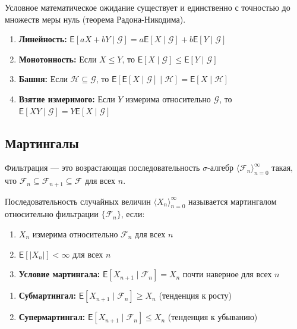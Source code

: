 \documentclass[11pt, a4paper]{extarticle}
\newcommand{\si}{\sigma}
\newcommand{\Gcal}{{\mathcal G}}
\newcommand{\Fcal}{{\mathcal F}}
\newcommand{\E}{{\mathsf E}}
\newcommand{\Hcal}{{\mathcal H}}
\renewcommand{\le}{\leqslant}
\begin{document}
\begin{theorem}
Условное математическое ожидание существует и единственно с точностью до множеств меры нуль (теорема Радона-Никодима).
\end{theorem}

\begin{theorem}\;
\begin{enumerate}
    \item \textbf{Линейность:} $\E[aX + bY \mid \Gcal] = a\E[X \mid \Gcal] + b\E[Y \mid \Gcal]$
    \item \textbf{Монотонность:} Если $X \le Y$, то $\E[X \mid \Gcal] \le \E[Y \mid \Gcal]$
    \item \textbf{Башня:} Если $\Hcal \subseteq \Gcal$, то $\E[\E[X \mid \Gcal] \mid \Hcal] = \E[X \mid \Hcal]$
    \item \textbf{Взятие измеримого:} Если $Y$ измерима относительно $\Gcal$, то $\E[XY \mid \Gcal] = Y \E[X \mid \Gcal]$
\end{enumerate}
\end{theorem}

\subsection{Мартингалы}

\begin{definition}[Фильтрация]
Фильтрация --- это возрастающая последовательность $\si$-алгебр $\langle \Fcal_n \rangle_{n=0}^\infty$ такая, что $\Fcal_n \subseteq \Fcal_{n+1} \subseteq \Fcal$ для всех $n$.
\end{definition}

\begin{definition}[Мартингал]
Последовательность случайных величин $\langle X_n \rangle_{n=0}^\infty$ называется мартингалом относительно фильтрации $\{\Fcal_n\}$, если:
\begin{enumerate}
    \item $X_n$ измерима относительно $\Fcal_n$ для всех $n$
    \item $\E[|X_n|] < \infty$ для всех $n$
    \item \textbf{Условие мартингала:} $\E[X_{n+1} \mid \Fcal_n] = X_n$ почти наверное для всех $n$
\end{enumerate}
\end{definition}

\begin{definition}
\begin{enumerate}
    \item \textbf{Субмартингал:} $\E[X_{n+1} \mid \Fcal_n] \geq X_n$ (тенденция к росту)
    \item \textbf{Супермартингал:} $\E[X_{n+1} \mid \Fcal_n] \le X_n$ (тенденция к убыванию)
\end{enumerate}
\end{definition}
\end{document}
